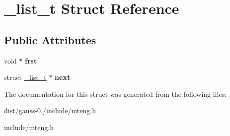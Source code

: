 \hypertarget{struct__list__t}{\section{\-\_\-list\-\_\-t Struct Reference}
\label{struct__list__t}
}
\subsection*{Public Attributes}
\begin{DoxyCompactItemize}
\item 
\hypertarget{struct__list__t_a7281d861626511e3047ca2bf58583ff7}{void $\ast$ {\bfseries frst}}\label{struct__list__t_a7281d861626511e3047ca2bf58583ff7}

\item 
\hypertarget{struct__list__t_a3cc7d8530b5c29a1e840e98e27e8da96}{struct \hyperlink{struct__list__t}{\-\_\-list\-\_\-t} $\ast$ {\bfseries next}}\label{struct__list__t_a3cc7d8530b5c29a1e840e98e27e8da96}

\end{DoxyCompactItemize}


The documentation for this struct was generated from the following files\-:\begin{DoxyCompactItemize}
\item 
dist/gauss-\/0./include/mteng.\-h\item 
include/mteng.\-h\end{DoxyCompactItemize}
